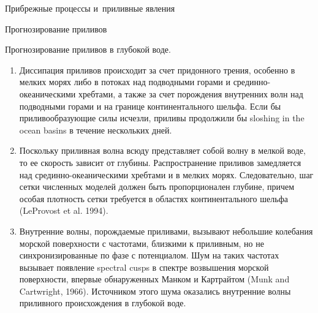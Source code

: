 \begin{chapter}{Прибрежные процессы и~приливные явления}
\begin{section}{Прогнозирование приливов}
\begin{paragraph}{Прогнозирование приливов в глубокой воде.}
\begin{enumerate}
\item 
Диссипация приливов происходит за счет придонного трения, особенно в мелких
морях либо в потоках над подводными горами и срединно-океаническими
хребтами, а также за счет порождения внутренних волн над подводными горами
и на границе континентального шельфа. Если бы приливообразующие силы
исчезли, приливы продолжили бы sloshing in the ocean basins 
в течение нескольких дней.
%

\item 
Поскольку приливная волна всюду представляет собой волну в мелкой воде,
то ее скорость зависит от глубины. Распространение приливов замедляется
над срединно-океаническими хребтами и в мелких морях. Следовательно,
шаг сетки численных моделей должен быть пропорционален глубине,
причем особая плотность сетки требуется в областях континентального 
шельфа (LeProvost et al. 1994).
%

\item 
Внутренние волны, порождаемые приливами, вызывают небольшие колебания морской
поверхности с частотами, близкими к приливным, но не синхронизированные
по фазе с потенциалом. 
Шум на таких частотах вызывает появление spectral cusps в спектре
возвышения морской поверхности, впервые обнаруженных Манком и 
Картрайтом (Munk and Cartwright, 1966). Источником этого шума оказались
внутренние волны приливного происхождения в глубокой воде.
%
\end{enumerate}


\end{paragraph}
\end{section}
\end{chapter}
